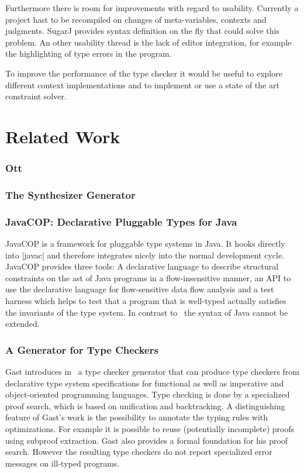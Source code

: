 Furthermore there is room for improvements with regard to
usability. Currently a project hast to be recompiled on changes of
meta-variables, contexts and judgments. SugarJ  provides
syntax definition on the fly that could solve this problem. An other
usability thread is the lack of editor integration, for example the
highlighting of type errors in the program.

To improve the performance of the type checker it would be useful to
explore different context implementations and to implement or use a
state of the art constraint solver.
\section{Related Work}
\subsubsection{Ott}
\subsubsection{The Synthesizer Generator}
\subsubsection{JavaCOP: Declarative Pluggable Types for Java}
JavaCOP \cite{Markstrum:2010:JDP:1667048.1667049} is a framework for
pluggable type systems in Java. It hooks directly into \code|javac|
and therefore integrates nicely into the normal development
cycle. JavaCOP provides three tools: A declarative language to
describe structural constraints on the \gls{ast} of Java programs in a
flow-insensitive manner, an API to use the declarative language for
flow-sensitive data flow analysis and a test harness which helps to
test that a program that is well-typed actually satisfies the
invariants of the type system. In contrast to~\cite{bergan2007typmix}
the syntax of Java cannot be extended.


\subsubsection{A Generator for Type Checkers}
Gast introduces in~\cite{gast2005generator} a type checker generator
that can produce type checkers from declarative type system
specifications for functional as well as imperative and
object-oriented programming languages. Type checking is done by a
specialized proof search, which is based on unification and
backtracking. A distinguishing feature of Gast's work is the
possibility to annotate the typing rules with optimizations. For
example it is possible to reuse (potentially incomplete) proofs using
subproof extraction. Gast also provides a formal foundation for his
proof search. However the resulting type checkers do not report
specialized error messages on ill-typed programs.

